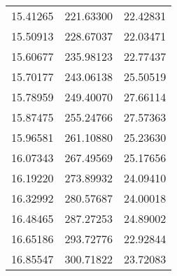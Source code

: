 \begin{table}
\begin{tabular}{S[table-format=2.5] S[table-format=3.5] S[table-format=2.5]}
    15.41265 & 221.63300 & 22.42831 \\
    15.50913 & 228.67037 & 22.03471 \\
    15.60677 & 235.98123 & 22.77437 \\
    15.70177 & 243.06138 & 25.50519 \\
    15.78959 & 249.40070 & 27.66114 \\
    15.87475 & 255.24766 & 27.57363 \\
    15.96581 & 261.10880 & 25.23630 \\
    16.07343 & 267.49569 & 25.17656 \\
    16.19220 & 273.89932 & 24.09410 \\
    16.32992 & 280.57687 & 24.00018 \\
    16.48465 & 287.27253 & 24.89002 \\
    16.65186 & 293.72776 & 22.92844 \\
    16.85547 & 300.71822 & 23.72083 \\
    \bottomrule
  \end{tabular}
\end{table}
